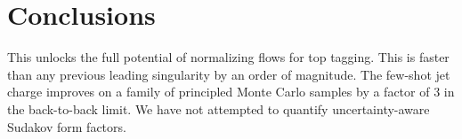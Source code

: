 \section{Conclusions}\label{sec:conclusions}

This unlocks the full potential of normalizing flows for top tagging.
This is faster than any previous leading singularity by an order of
magnitude. The few-shot jet charge improves on a family of principled
Monte Carlo samples by a factor of 3 in the back-to-back limit. We have
not attempted to quantify uncertainty-aware Sudakov form factors.

